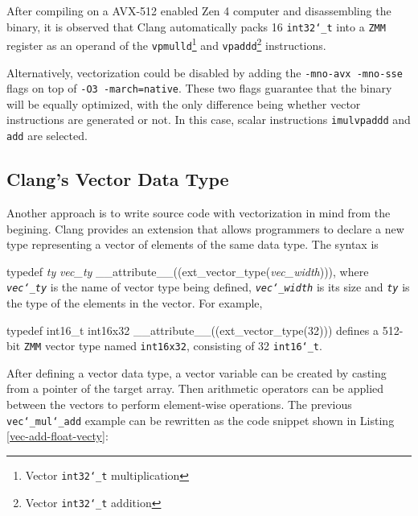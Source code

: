 \documentclass[logo,bsc,singlespacing,parskip]{infthesis}
\newcommand{\dtint}{\texttt{int32\char`_t}}
\newcommand{\zmm}{\texttt{ZMM}}
\newenvironment{VerbatimCompact}
  {\vspace*{-2.5mm}\VerbatimEnvironment
   \par\Verbatim}
  {\endVerbatim\vspace*{-2.4mm}}
\begin{document}
After compiling on a AVX-512 enabled Zen 4 computer and disassembling the
binary, it is observed that Clang automatically packs 16 \dtint{} into a \zmm{}
register as an operand of the \texttt{vpmulld}\footnote{Vector \dtint{} multiplication} and \texttt{vpaddd}\footnote{Vector \dtint{} addition} instructions. 

Alternatively, vectorization could be disabled by adding the \texttt{-mno-avx
-mno-sse} flags on top of \texttt{-O3 -march=native}. These two flags
guarantee that the binary will be equally optimized, with the only difference being whether vector instructions are generated or not. In this case, scalar instructions \texttt{imul}\texttt{vpaddd} and \texttt{add} are selected.

\subsection{Clang's Vector Data Type}

Another approach is to write source code with vectorization in mind from the begining.
Clang provides an extension that allows programmers to declare a new type
representing a vector of elements of the same data type. The syntax is 
\begin{VerbatimCompact}[commandchars=\\\{\}]
typedef \textit{ty} \textit{vec_ty} __attribute__((ext_vector_type(\textit{vec_width}))), 
\end{VerbatimCompact}
where \textit{\texttt{vec\char`_ty}} is the name of vector type being defined,
\textit{\texttt{vec\char`_width}} is its size and \textit{\texttt{ty}} is the
type of the elements in the vector. For example, 
\begin{VerbatimCompact}[commandchars=\\\{\}]
typedef int16_t int16x32 __attribute__((ext_vector_type(32)))
\end{VerbatimCompact}
defines a 512-bit \zmm{} vector type named \texttt{int16x32}, consisting of 32
\texttt{int16\char`_t}. 

After defining a vector data type, a vector variable can be created by casting
from a pointer of the target array. Then arithmetic operators can be applied
between the vectors to perform element-wise operations. The previous
\texttt{vec\char`_mul\char`_add} example can be rewritten as the code snippet shown in Listing
\ref{vec-add-float-vecty}:
\end{document}
